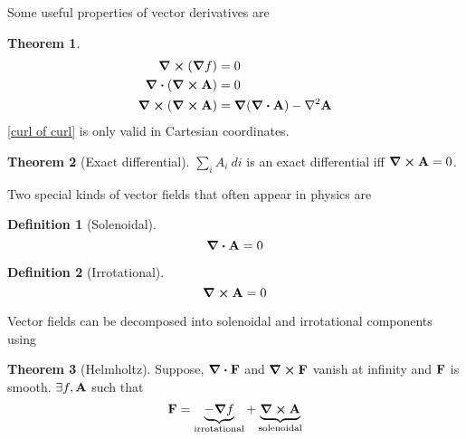 \documentclass[10pt, a4paper]{extarticle}
\theoremstyle{definition}
\newtheorem{thm}{Theorem}
\newtheorem{defn}{Definition}
\numberwithin{equation}{subsection}
\begin{document}
Some useful properties of vector derivatives are
\begin{framed}
	\begin{thm}
		\begin{align}
			\curl(\grad f)     & =0                                                      \\
			\div(\curl\vb{A})  & =0                                                      \\
			\curl(\curl\vb{A}) & =\grad(\div\vb{A})-\laplacian\vb{A}\label{curl of curl}
		\end{align}
		\eqref{curl of curl} is only valid in Cartesian coordinates.
	\end{thm}
\end{framed}
\begin{framed}
	\begin{thm}[Exact differential]
		$\sum_i A_i\ di$ is an exact differential iff $\curl \vb{A}=0$.
	\end{thm}
\end{framed}
Two special kinds of vector fields that often appear in physics are
\begin{framed}
	\begin{defn}[Solenoidal]
		\begin{equation}\div\vb{A}=0\end{equation}
	\end{defn}
	\begin{defn}[Irrotational]
		\begin{equation}\curl\vb{A}=0\end{equation}
	\end{defn}
\end{framed}
Vector fields can be decomposed into solenoidal and irrotational components using
\begin{framed}
	\begin{thm}[Helmholtz]
		Suppose, $\div \vb{F}$ and $\curl\vb{F}$ vanish at infinity and $\vb{F}$ is smooth. $\exists f,\vb{A}$ such that
		\begin{equation}\vb{F}=\underbrace{-\grad f}_{\text{irrotational}}+\underbrace{\curl\vb{A}}_{\text{solenoidal}}\end{equation}
	\end{thm}
\end{framed}
\end{document}
